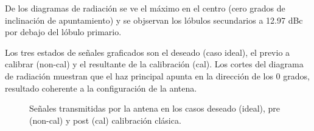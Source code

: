 De los diagramas de radiación se ve el máximo en el centro (cero grados de inclinación de apuntamiento) y se objservan los
lóbulos secundarios a 12.97 dBc por debajo del lóbulo primario.

Los tres estados de señales graficados son el deseado (caso ideal), el previo a calibrar (non-cal) y el resultante de la
calibración (cal). Los cortes del diagrama de radiación muestran que el haz principal apunta en la dirección de los 0 grados,
resultado coherente a la configuración de la antena.

\begin{figure}[H]
	\centering

	\caption{Señales transmitidas por la antena en los casos deseado (ideal), pre (non-cal) y post (cal) calibración clásica.}
	\label{fig:nonErrClassical10degCol}
\end{figure}

